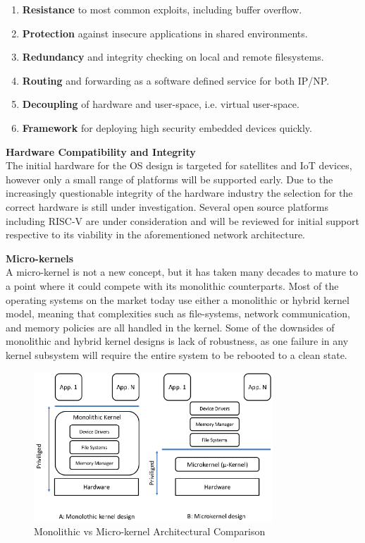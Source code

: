 \documentclass[11pt]{article}
\begin{document}
\begin{enumerate}
    \item \textbf{Resistance} to most common exploits, including buffer overflow.
    \item \textbf{Protection} against insecure applications in shared environments.
    \item \textbf{Redundancy} and integrity checking on local and remote filesystems.
    \item \textbf{Routing} and forwarding as a software defined service for both IP/NP.
    \item \textbf{Decoupling} of hardware and user-space, i.e. virtual user-space.
    \item \textbf{Framework} for deploying high security embedded devices quickly.
\end{enumerate}

\bigskip
{\noindent\textbf{Hardware Compatibility and Integrity}} \\

\noindent The initial hardware for the OS design is targeted for satellites and IoT devices, however only a small range of platforms will be supported early. 
Due to the increasingly questionable integrity of the hardware industry the selection for the correct hardware is still under investigation. 
Several open source platforms including RISC-V are under consideration and will be reviewed for initial support respective to its viability in the aforementioned network architecture.

\bigskip
{\noindent\textbf{Micro-kernels}} \\

\noindent A micro-kernel is not a new concept, but it has taken many decades to mature to a point where it could compete with its monolithic counterparts. 
Most of the operating systems on the market today use either a monolithic or hybrid kernel model, meaning that complexities such as file-systems, network communication, and memory policies are all handled in the kernel.
Some of the downsides of monolithic and hybrid kernel designs is lack of robustness, as one failure in any kernel subsystem will require the entire system to be rebooted to a clean state.

\begin{figure}[h]
    \centering
    \includegraphics[width=0.8\textwidth]{./images/rsz_mono_micro.png} 
    \caption{Monolithic vs Micro-kernel Architectural Comparison \cite{kernel-architecture}}
\end{figure}
\end{document}
